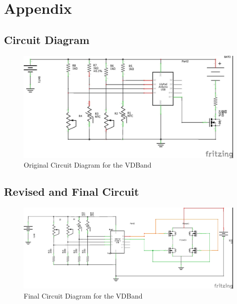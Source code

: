 \documentclass[11.5pt]{article}
\begin{document}
\begin{thebibliography}{9}

%


\end{thebibliography}

\newpage

\renewcommand*{\thepage}{A\arabic{page}}
\appendix 
\newpage

\section{Appendix}
\subsection{Circuit Diagram}
\begin{figure}[!ht]
    \centering
    \includegraphics[width=0.9\linewidth]{Appendix/circuit.jpg}
    \caption{Original Circuit Diagram for the VDBand}
    \label{fig:circuit}
\end{figure}
\vspace{0.5mm}
\newpage

\subsection{Revised and Final Circuit}
\begin{figure}[!ht]
    \centering
    \includegraphics[width=0.9\linewidth]{Appendix/Updated.jpg}
    \caption{Final Circuit Diagram for the VDBand}
    \label{fig:IO}
\end{figure}
\vspace{0.5mm}
\newpage
\end{document}

